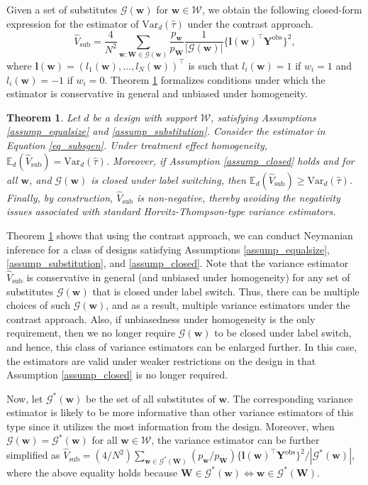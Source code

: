 \documentclass[12pt]{article}
\newcommand{\Var}{{\text{Var}}}
\newcommand{\E}{{\mathbb{E}}}
\newtheorem{theorem}{Theorem}[section]
\begin{document}
Given a set of substitutes $\mathcal{G}(\bm{w})$ for $\bm{w} \in \mathcal{W}$, we obtain the following closed-form expression for the estimator of $\Var_d(\hat{\tau})$ under the contrast approach. 
\begin{equation}
\hat{V}_{\text{sub}} = \frac{4}{N^2}\sum_{\bm{w}:\bm{W} \in \mathcal{G}(\bm{w})} \frac{p_{\bm{w}}}{p_{\bm{W}}} \frac{1}{|\mathcal{G}(\bm{w})|}\{\bm{l}(\bm{w})^\top \bm{Y}^{\text{obs}}\}^2,
\label{eq_subsgen}
\end{equation}
where $\bm{l}(\bm{w}) = (l_1(\bm{w}),...,l_N(\bm{w}))^\top$ is such that $l_i(\bm{w}) = 1$ if $w_i = 1$ and $l_i(\bm{w}) = -1$ if $w_i = 0$.
Theorem \ref{thm_substitution} formalizes conditions under which the estimator is conservative in general and unbiased under homogeneity.   
\begin{theorem} \normalfont
Let $d$ be a design with support $\mathcal{W}$, satisfying Assumptions \ref{assump_equalsize} and \ref{assump_substitution}. Consider the estimator in Equation \ref{eq_subsgen}. Under treatment effect homogeneity, $\E_d(\hat{V}_{\text{sub}}) = \Var_d(\hat{\tau})$. Moreover, if Assumption \ref{assump_closed} holds and for all $\bm{w}$, and $\mathcal{G}(\bm{w})$ is closed under label switching, then $\E_d(\hat{V}_{\text{sub}}) \geq \Var_d(\hat{\tau})$. 
Finally, by construction, $\hat{V}_{\text{sub}}$ is non-negative, thereby avoiding the negativity issues associated with standard Horvitz-Thompson-type variance estimators. 
\label{thm_substitution}
\end{theorem}
Theorem \ref{thm_substitution} shows that using the contrast approach, we can conduct Neymanian inference for a class of designs satisfying Assumptions \ref{assump_equalsize}, \ref{assump_substitution}, and \ref{assump_closed}. 
Note that the variance estimator $\hat{V}_{\text{sub}}$ is conservative in general (and unbiased under homogeneity) for any set of substitutes $\mathcal{G}(\bm{w})$ that is closed under label switch. Thus, there can be multiple choices of such $\mathcal{G}(\bm{w})$, and as a result, multiple variance estimators under the contrast approach. Also, if unbiasedness under homogeneity is the only requirement, then we no longer require $\mathcal{G}(\bm{w})$ to be closed under label switch, and hence, this class of variance estimators can be enlarged further. In this case, the estimators are valid under weaker restrictions on the design in that Assumption \ref{assump_closed} is no longer required.

Now, let $\mathcal{G}^*(\bm{w})$ be the set of all substitutes of $\bm{w}$. The corresponding variance estimator is likely to be more informative than other variance estimators of this type since it utilizes the most information from the design. Moreover, when $\mathcal{G}(\bm{w}) = \mathcal{G}^*(\bm{w})$ for all $\bm{w} \in \mathcal{W}$, the variance estimator can be further simplified as
$\hat{V}_{\text{sub}} = (4/N^2)\sum_{\bm{w} \in \mathcal{G}^*(\bm{W})} (p_{\bm{w}}/p_{\bm{W}})\{\bm{l}(\bm{w})^\top \bm{Y}^{\text{obs}}\}^2/|\mathcal{G}^*(\bm{w})|$,  
where the above equality holds because $\bm{W} \in \mathcal{G}^*(\bm{w}) \iff \bm{w} \in \mathcal{G}^*(\bm{W})$.
\end{document}
